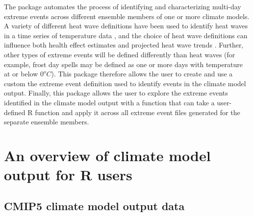 The  package automates the process of identifying
and characterizing multi-day extreme events across different ensemble
members of one or more climate models. A variety of different heat wave
definitions have been used to identify heat waves in a time series of
temperature data \citep{smith2013heat}, and the choice of heat wave
definitions can influence both health effect estimates
\citep{chen2015influence, kent2014heat} and projected heat wave trends
\citep{smith2013heat}. Further, other types of extreme events will be
defined differently than heat waves (for example, frost day spells may
be defined as one or more days with temperature at or below \(0^oC\)).
This package therefore allows the user to create and use a custom the
extreme event definition used to identify events in the climate model
output. Finally, this package allows the user to explore the extreme
events identified in the climate model output with a function that can
take a user-defined R function and apply it across all extreme event
files generated for the separate ensemble members.

\section{An overview of climate model output for R
users}\label{an-overview-of-climate-model-output-for-r-users}

\subsection{CMIP5 climate model output
data}\label{cmip5-climate-model-output-data}

